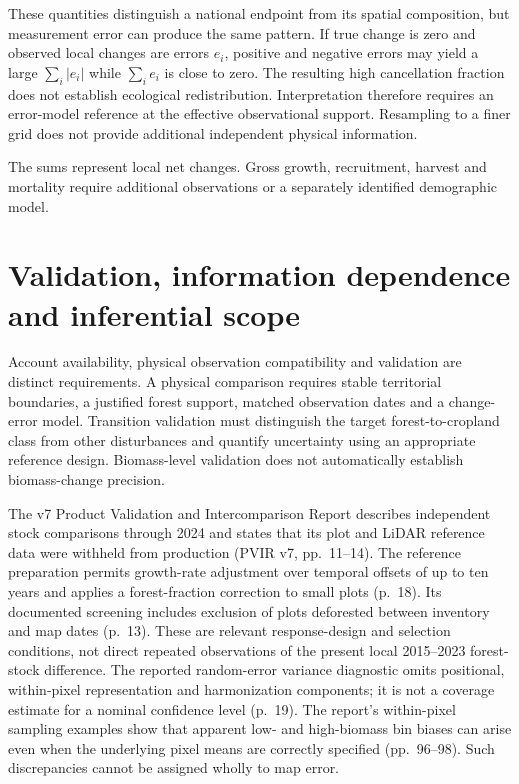 \documentclass[11pt,a4paper]{article}
\begin{document}
These quantities distinguish a national endpoint from its spatial composition, but measurement error can produce the same pattern. If true change is zero and observed local changes are errors $e_i$, positive and negative errors may yield a large $\sum_i|e_i|$ while $\sum_i e_i$ is close to zero. The resulting high cancellation fraction does not establish ecological redistribution. Interpretation therefore requires an error-model reference at the effective observational support. Resampling to a finer grid does not provide additional independent physical information.

The sums represent local net changes. Gross growth, recruitment, harvest and mortality require additional observations or a separately identified demographic model.

\section{Validation, information dependence and inferential scope}

Account availability, physical observation compatibility and validation are distinct requirements. A physical comparison requires stable territorial boundaries, a justified forest support, matched observation dates and a change-error model. Transition validation must distinguish the target forest-to-cropland class from other disturbances and quantify uncertainty using an appropriate reference design. Biomass-level validation does not automatically establish biomass-change precision.

The v7 Product Validation and Intercomparison Report describes independent stock comparisons through 2024 and states that its plot and LiDAR reference data were withheld from production (PVIR v7, pp.~11--14). The reference preparation permits growth-rate adjustment over temporal offsets of up to ten years and applies a forest-fraction correction to small plots (p.~18). Its documented screening includes exclusion of plots deforested between inventory and map dates (p.~13). These are relevant response-design and selection conditions, not direct repeated observations of the present local 2015--2023 forest-stock difference. The reported random-error variance diagnostic omits positional, within-pixel representation and harmonization components; it is not a coverage estimate for a nominal confidence level (p.~19). The report's within-pixel sampling examples show that apparent low- and high-biomass bin biases can arise even when the underlying pixel means are correctly specified (pp.~96--98). Such discrepancies cannot be assigned wholly to map error.
\end{document}
